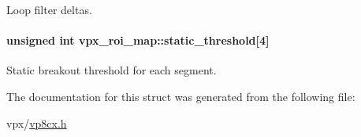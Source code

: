 \-Loop filter deltas. \hypertarget{structvpx__roi__map_a3354ff458e229361b53a0b2d1bf68cfb}{
\paragraph[{static\-\_\-threshold}]{\setlength{\rightskip}{0pt plus 5cm}unsigned int {\bf vpx\-\_\-roi\-\_\-map\-::static\-\_\-threshold}\mbox{[}4\mbox{]}}}\label{structvpx__roi__map_a3354ff458e229361b53a0b2d1bf68cfb}
\-Static breakout threshold for each segment. 

\-The documentation for this struct was generated from the following file\-:\begin{DoxyCompactItemize}
\item 
vpx/\hyperlink{vp8cx_8h}{vp8cx.\-h}\end{DoxyCompactItemize}
